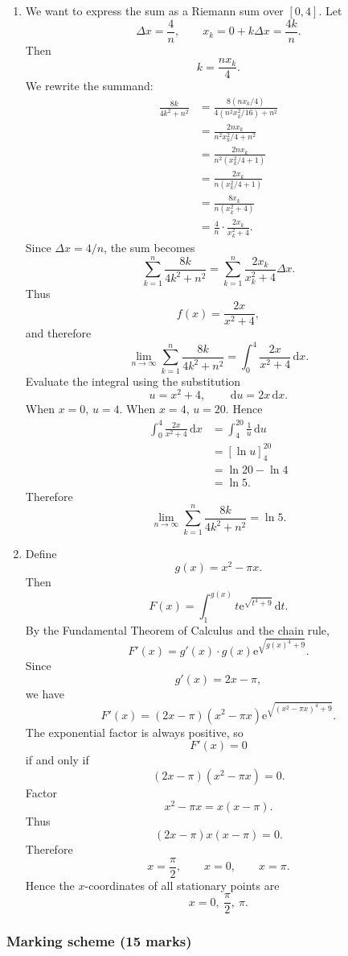 \documentclass[12pt]{article}
\newcommand{\dd}{\,\mathrm{d}}
\newcommand{\ee}{\mathrm{e}}
\begin{document}
\begin{enumerate}[label=(\alph*)]
\item We want to express the sum as a Riemann sum over $[0,4]$. Let
\[
\Delta x=\frac4n,
\qquad
x_k=0+k\Delta x=\frac{4k}{n}.
\]
Then
\[
k=\frac{nx_k}{4}.
\]
We rewrite the summand:
\begin{align*}
\frac{8k}{4k^2+n^2}
&=
\frac{8(nx_k/4)}{4(n^2x_k^2/16)+n^2}\\
&=
\frac{2nx_k}{n^2x_k^2/4+n^2}\\
&=
\frac{2nx_k}{n^2\left(x_k^2/4+1\right)}\\
&=
\frac{2x_k}{n\left(x_k^2/4+1\right)}\\
&=
\frac{8x_k}{n(x_k^2+4)}\\
&=
\frac4n\cdot \frac{2x_k}{x_k^2+4}.
\end{align*}
Since $\Delta x=4/n$, the sum becomes
\[
\sum_{k=1}^n
\frac{8k}{4k^2+n^2}
=
\sum_{k=1}^n
\frac{2x_k}{x_k^2+4}\Delta x.
\]
Thus
\[
f(x)=\frac{2x}{x^2+4},
\]
and therefore
\[
\lim_{n\to\infty}\sum_{k=1}^n
\frac{8k}{4k^2+n^2}
=
\int_0^4\frac{2x}{x^2+4}\dd x.
\]
Evaluate the integral using the substitution
\[
u=x^2+4,
\qquad
\dd u=2x\dd x.
\]
When $x=0$, $u=4$. When $x=4$, $u=20$. Hence
\begin{align*}
\int_0^4\frac{2x}{x^2+4}\dd x
&=
\int_4^{20}\frac1u\dd u\\
&=
\left[\ln u\right]_4^{20}\\
&=
\ln 20-\ln 4\\
&=
\ln 5.
\end{align*}
Therefore
\[
\boxed{\displaystyle
\lim_{n\to\infty}\sum_{k=1}^n
\frac{8k}{4k^2+n^2}
=
\ln 5.}
\]

\item Define
\[
g(x)=x^2-\pi x.
\]
Then
\[
F(x)=\int_1^{g(x)} t\ee^{\sqrt{t^4+9}}\dd t.
\]
By the Fundamental Theorem of Calculus and the chain rule,
\[
F'(x)
=
g'(x)\cdot g(x)\ee^{\sqrt{g(x)^4+9}}.
\]
Since
\[
g'(x)=2x-\pi,
\]
we have
\[
F'(x)
=
(2x-\pi)(x^2-\pi x)
\ee^{\sqrt{(x^2-\pi x)^4+9}}.
\]
The exponential factor is always positive, so
\[
F'(x)=0
\]
if and only if
\[
(2x-\pi)(x^2-\pi x)=0.
\]
Factor
\[
x^2-\pi x=x(x-\pi).
\]
Thus
\[
(2x-\pi)x(x-\pi)=0.
\]
Therefore
\[
x=\frac{\pi}{2},\qquad x=0,\qquad x=\pi.
\]
Hence the $x$-coordinates of all stationary points are
\[
\boxed{x=0,\ \frac{\pi}{2},\ \pi.}
\]
\end{enumerate}

\subsubsection{Marking scheme (15 marks)}
\end{document}
